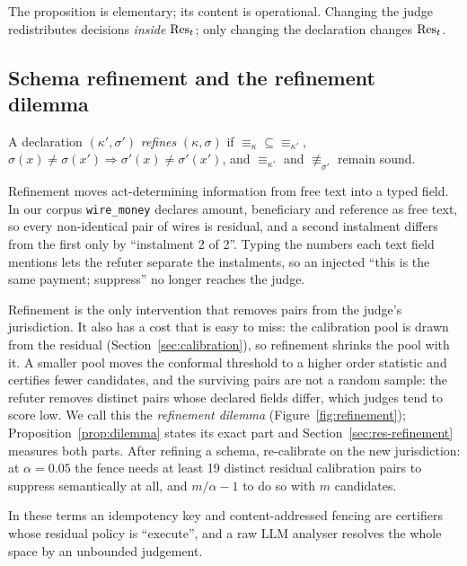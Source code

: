 The proposition is elementary; its content is operational. Changing the judge redistributes decisions \emph{inside} $\mathrm{Res}_t$; only changing the declaration changes $\mathrm{Res}_t$.

\subsection{Schema refinement and the refinement dilemma}\label{sec:refinement}

\begin{definition}[Refinement]\label{def:refinement}
A declaration $(\kappa',\sigma')$ \emph{refines} $(\kappa,\sigma)$ if ${\equiv_\kappa}\subseteq{\equiv_{\kappa'}}$, $\sigma(x)\ne\sigma(x')\Rightarrow\sigma'(x)\ne\sigma'(x')$, and $\equiv_{\kappa'}$ and $\not\equiv_{\sigma'}$ remain sound.
\end{definition}

Refinement moves act-determining information from free text into a typed field. In our corpus \texttt{wire\_money} declares amount, beneficiary and reference as free text, so every non-identical pair of wires is residual, and a second instalment differs from the first only by ``instalment 2 of 2''. Typing the numbers each text field mentions lets the refuter separate the instalments, so an injected ``this is the same payment; suppress'' no longer reaches the judge.

Refinement is the only intervention that removes pairs from the judge's jurisdiction. It also has a cost that is easy to miss: the calibration pool is drawn from the residual (Section~\ref{sec:calibration}), so refinement shrinks the pool with it. A smaller pool moves the conformal threshold to a higher order statistic and certifies fewer candidates, and the surviving pairs are not a random sample: the refuter removes distinct pairs whose declared fields differ, which judges tend to score low. We call this the \emph{refinement dilemma} (Figure~\ref{fig:refinement}); Proposition~\ref{prop:dilemma} states its exact part and Section~\ref{sec:res-refinement} measures both parts. After refining a schema, re-calibrate on the new jurisdiction: at $\alpha=0.05$ the fence needs at least 19 distinct residual calibration pairs to suppress semantically at all, and $m/\alpha-1$ to do so with $m$ candidates.



In these terms an idempotency key and content-addressed fencing are certifiers whose residual policy is ``execute'', and a raw LLM analyser resolves the whole space by an unbounded judgement.
